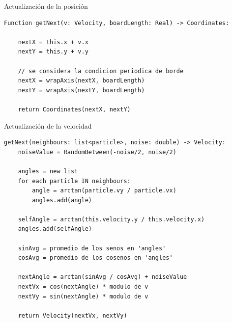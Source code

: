 
    



\begin{frame}[fragile]{Actualización de la posición}
  \begin{lstlisting}
Function getNext(v: Velocity, boardLength: Real) -> Coordinates:

    nextX = this.x + v.x
    nextY = this.y + v.y
    
    // se considera la condicion periodica de borde
    nextX = wrapAxis(nextX, boardLength)
    nextY = wrapAxis(nextY, boardLength)

    return Coordinates(nextX, nextY)
  \end{lstlisting}
\end{frame}

\begin{frame}[fragile]{Actualización de la velocidad}
  \begin{lstlisting}
getNext(neighbours: list<particle>, noise: double) -> Velocity:
    noiseValue = RandomBetween(-noise/2, noise/2)
    
    angles = new list
    for each particle IN neighbours:
        angle = arctan(particle.vy / particle.vx)
        angles.add(angle)

    selfAngle = arctan(this.velocity.y / this.velocity.x)
    angles.add(selfAngle)

    sinAvg = promedio de los senos en 'angles'
    cosAvg = promedio de los cosenos en 'angles'

    nextAngle = arctan(sinAvg / cosAvg) + noiseValue
    nextVx = cos(nextAngle) * modulo de v
    nextVy = sin(nextAngle) * modulo de v

    return Velocity(nextVx, nextVy)
  \end{lstlisting}
\end{frame}